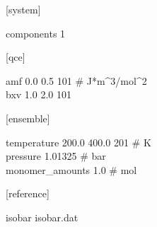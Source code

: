 \documentclass{scrartcl}
\begin{document}
\begin{addmargin}[1cm]{0cm}
    \ttfamily
    \begin{minipage}{\textwidth}
        [system]
        \begin{addmargin}[1cm]{0cm}
            components 1
        \end{addmargin}
    \end{minipage}

    \begin{minipage}{\textwidth}
        [qce]
        \begin{addmargin}[1cm]{0cm}
            amf 0.0 0.5 101 \# J*m\^{}3/mol\^{}2 \\
            bxv 1.0 2.0 101
        \end{addmargin}
    \end{minipage}

    \begin{minipage}{\textwidth}
        [ensemble]
        \begin{addmargin}[1cm]{0cm}
            temperature 200.0 400.0 201 \# K \\
            pressure 1.01325 \# bar \\
            monomer\_amounts 1.0 \# mol
        \end{addmargin}
    \end{minipage}

    \begin{minipage}{\textwidth}
        [reference]
        \begin{addmargin}[1cm]{0cm}
            isobar isobar.dat
        \end{addmargin}
    \end{minipage}
\end{addmargin}

\
\end{document}

